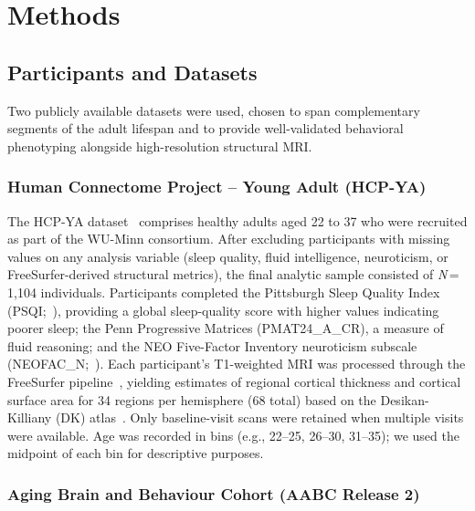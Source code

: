 
\section{Methods}
\label{sec:methods}

\subsection{Participants and Datasets}
\label{sec:methods-data}

Two publicly available datasets were used, chosen to span complementary segments of the adult lifespan and to provide well-validated behavioral phenotyping alongside high-resolution structural MRI.

\subsubsection{Human Connectome Project -- Young Adult (HCP-YA)}

The HCP-YA dataset~\cite{vanessen2013wuminn} comprises healthy adults aged 22 to 37 who were recruited as part of the WU-Minn consortium.
After excluding participants with missing values on any analysis variable (sleep quality, fluid intelligence, neuroticism, or FreeSurfer-derived structural metrics), the final analytic sample consisted of \textit{N}\,=\,1{,}104 individuals.
Participants completed the Pittsburgh Sleep Quality Index (PSQI;~\cite{buysse1989pittsburgh}), providing a global sleep-quality score with higher values indicating poorer sleep; the Penn Progressive Matrices (PMAT24\_A\_CR), a measure of fluid reasoning; and the NEO Five-Factor Inventory neuroticism subscale (NEOFAC\_N;~\cite{costa1992neo}).
Each participant's T1-weighted MRI was processed through the FreeSurfer pipeline~\cite{fischl2012freesurfer}, yielding estimates of regional cortical thickness and cortical surface area for 34 regions per hemisphere (68 total) based on the Desikan-Killiany (DK) atlas~\cite{desikan2006automated}.
Only baseline-visit scans were retained when multiple visits were available.
Age was recorded in bins (e.g., 22--25, 26--30, 31--35); we used the midpoint of each bin for descriptive purposes.

\subsubsection{Aging Brain and Behaviour Cohort (AABC Release 2)}

